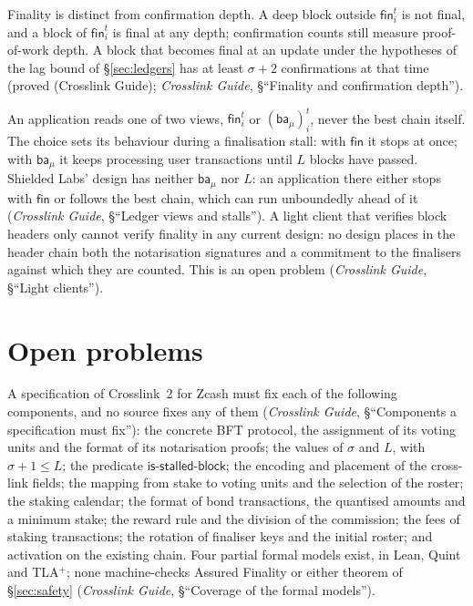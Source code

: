 \documentclass[11pt,a4paper]{article}
\theoremstyle{definition}
\newcommand{\isstalledblock}{\mathsf{is\text{-}stalled\text{-}block}}
\newcommand{\fin}{\mathsf{fin}}
\newcommand{\ba}{\mathsf{ba}}
\begin{document}
Finality is distinct from confirmation depth. A deep block outside
$\fin_i^t$ is not final, and a block of $\fin_i^t$ is final at any depth;
confirmation counts still measure proof-of-work depth. A block that becomes
final at an update under the hypotheses of the lag bound of
\S\ref{sec:ledgers} has at least $\sigma + 2$ confirmations at that time
(proved (Crosslink Guide); \emph{Crosslink Guide}, \S``Finality and
confirmation depth'').

An application reads one of two views, $\fin_i^t$ or $(\ba_\mu)_i^t$, never
the best chain itself. The choice sets its behaviour during a finalisation
stall: with $\fin$ it stops at once; with $\ba_\mu$ it keeps processing user
transactions until $L$ blocks have passed. Shielded Labs' design has neither
$\ba_\mu$ nor $L$: an application there either stops with $\fin$ or follows
the best chain, which can run unboundedly ahead of it (\emph{Crosslink
Guide}, \S``Ledger views and stalls''). A light client that verifies block
headers only cannot verify finality in any current design: no design places
in the header chain both the notarisation signatures and a commitment to
the finalisers against which they are counted. This is an open problem
(\emph{Crosslink Guide}, \S``Light clients'').

\section{Open problems}\label{sec:open}

A specification of Crosslink~2 for Zcash must fix each of the following
components, and no source fixes any of them (\emph{Crosslink Guide},
\S``Components a specification must fix''): the concrete BFT protocol, the
assignment of its voting units and the format of its notarisation proofs;
the values of $\sigma$ and $L$, with $\sigma + 1 \le L$; the predicate
$\isstalledblock$; the encoding and placement of the cross-link fields; the
mapping from stake to voting units and the selection of the roster; the
staking calendar; the format of bond transactions, the quantised amounts and
a minimum stake; the reward rule and the division of the commission; the
fees of staking transactions; the rotation of finaliser keys and the initial
roster; and activation on the existing chain. Four partial formal models
exist, in Lean, Quint and TLA$^{+}$; none machine-checks Assured Finality or
either theorem of \S\ref{sec:safety} (\emph{Crosslink Guide}, \S``Coverage
of the formal models'').
\end{document}
